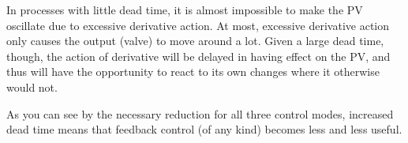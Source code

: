 In processes with little dead time, it is almost impossible to make the PV oscillate due to excessive derivative action.  At most, excessive derivative action only causes the output (valve) to move around a lot.  Given a large dead time, though, the action of derivative will be delayed in having effect on the PV, and thus will have the opportunity to react to its own changes where it otherwise would not.

\vskip 10pt

As you can see by the necessary reduction for all three control modes, increased dead time means that feedback control (of any kind) becomes less and less useful.











